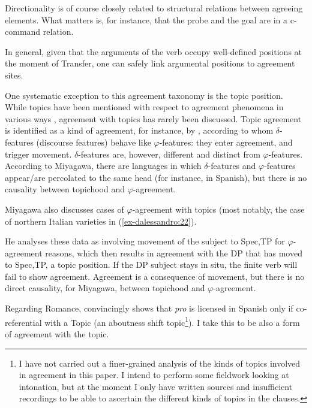 \documentclass[output=paper
,modfonts
,nonflat]{langsci/langscibook}
\begin{document}
Directionality is of course closely related to structural relations between agreeing elements. What matters is, for instance, that the probe and the goal are in a c-command relation.

In general, given that the arguments of the verb occupy well-defined positions at the moment of Transfer, one can safely link argumental positions to agreement sites.

One systematic exception to this agreement taxonomy is the topic position. While topics have been mentioned with respect to agreement phenomena in various ways \citep{Bresnan_Mchombo1987, Lambrecht1981}, agreement with topics has rarely been discussed. Topic agreement is identified as a kind of agreement, for instance, by \citet{Miyagawa2017}, according to whom $\delta $-features (discourse features) behave like $\varphi $-features: they enter agreement, and trigger movement. $\delta $-features are, however, different and distinct from $\varphi $-features. According to Miyagawa, there are languages in which $\delta $-features and $\varphi $-features appear/are percolated to the same head (for instance, in Spanish), but there is no causality between topichood and $\varphi $-agreement. 

Miyagawa also discusses cases of $\varphi $-agreement with topics (most notably, the case of northern Italian varieties in (\ref{ex-dalessandro:22}).

He analyses these data as involving movement of the subject to Spec,TP for $\varphi $-agreement reasons, which then results in agreement with the DP that has moved to Spec,TP, a topic position. If the DP subject stays in situ, the finite verb will fail to show agreement. Agreement is a consequence of movement, but there is no direct causality, for Miyagawa, between topichood and $\varphi $-agreement.

Regarding Romance, \citet{Jimenez_Fernandez2016} convincingly shows that \textit{pro} is licensed in Spanish only if co-referential with a Topic (an aboutness shift topic\footnote{
I have not carried out a finer-grained analysis of the kinds of topics involved in agreement in this paper. I intend to perform some fieldwork looking at intonation, but at the moment I only have written sources and insufficient recordings to be able to ascertain the different kinds of topics in the clauses.}). I take this to be also a form of agreement with the topic. 
\end{document}

